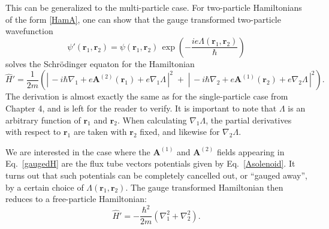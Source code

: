 \documentclass[pra,12pt]{revtex4}
\begin{document}
This can be generalized to the multi-particle case.  For two-particle
Hamiltonians of the form \eqref{HamA}, one can show that the gauge
transformed two-particle wavefunction
\begin{equation}
  \psi'(\mathbf{r}_1, \mathbf{r}_2) = \psi(\mathbf{r}_1, \mathbf{r}_2)
  \, \exp\!\left(-\frac{ie\Lambda(\mathbf{r}_1, \mathbf{r}_2)}{\hbar}\right)
\end{equation}
solves the Schr\"odinger equaton for the Hamiltonian
\begin{equation}
  \hat{H}' = \frac{1}{2m} \left( \left| \, -i\hbar \nabla_1
  + e\mathbf{A}^{(2)}(\mathbf{r}_1) + e \nabla_1 \Lambda\,\right|^2
  \;+\; \left| \, -i\hbar \nabla_2
  + e\mathbf{A}^{(1)}(\mathbf{r}_2) + e \nabla_2\Lambda\,\right|^2\right).
  \label{gaugedH}
\end{equation}
The derivation is almost exactly the same as for the single-particle
case from Chapter 4, and is left for the reader to verify.  It is
important to note that $\Lambda$ is an arbitrary function of
$\mathbf{r}_1$ and $\mathbf{r}_2$.  When calculating
$\nabla_1\Lambda$, the partial derivatives with respect to
$\mathbf{r}_1$ are taken with $\mathbf{r}_2$ fixed, and likewise for
$\nabla_2\Lambda$.

We are interested in the case where the $\mathbf{A}^{(1)}$ and
$\mathbf{A}^{(2)}$ fields appearing in Eq.~\eqref{gaugedH} are the
flux tube vectors potentials given by Eq.~\eqref{Asolenoid}.  It turns
out that such potentials can be completely cancelled out, or ``gauged
away'', by a certain choice of $\Lambda(\mathbf{r}_1, \mathbf{r}_2)$.
The gauge transformed Hamiltonian then reduces to a free-particle
Hamiltonian:
\begin{equation}
  \hat{H}' = - \frac{\hbar^2}{2m} \left( \nabla_1^2 + \nabla_2^2\right).
  \label{gaugedH2}
\end{equation}
\end{document}

